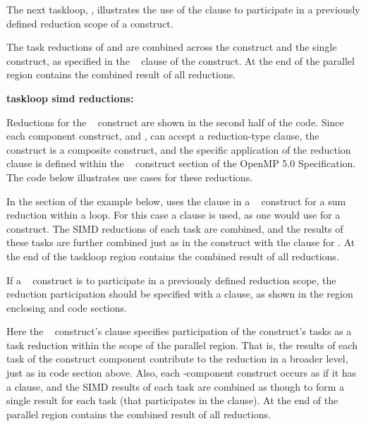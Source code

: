 The next taskloop, , illustrates the use of the 
 clause to participate in a previously defined
reduction scope of a  construct.

The task reductions of  and  are combined
across the  construct and the single  construct, as specified
in the ~ clause of the  construct.
At the end of the parallel region  contains the combined result of all reductions.

\textbf{taskloop simd reductions:}

Reductions for the ~ construct are shown in the second half of the code.
Since each component construct,  and , 
can accept a reduction-type clause, the ~ construct
is a composite construct, and the specific application of the reduction clause is defined
within the ~ construct section of the OpenMP 5.0 Specification.
The code below illustrates use cases for these reductions.

In the  section of the example below,
 uses the  clause 
in a ~ construct for a sum reduction within a loop.
For this case a  clause is used, as one would use 
for a  construct.
The SIMD reductions of each task are combined, and the results of these tasks are further 
combined just as in the  construct with the  clause for .
At the end of the taskloop region  contains the combined result of all reductions.

If a ~ construct is to participate in a previously defined 
reduction scope, the reduction participation should be specified with
a  clause, as shown in the  region enclosing
 and  code sections.  

Here the ~ construct's 
 clause specifies participation of the construct's tasks as 
a task reduction within the scope of the parallel region.  
That is, the results of each task of the  construct component 
contribute to the reduction in a broader level, just as in  code section above.
Also, each -component construct
occurs as if it has a  clause, and the
SIMD results of each task are combined as though to form a single result for
each task (that participates in the  clause).
At the end of the parallel region  contains the combined result of all reductions.

